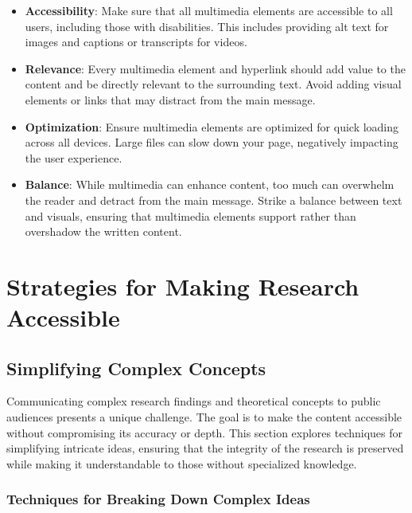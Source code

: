\documentclass[
]{book}
\begin{document}
\begin{itemize}
\item
  \textbf{Accessibility}: Make sure that all multimedia elements are accessible to all users, including those with disabilities. This includes providing alt text for images and captions or transcripts for videos.
\item
  \textbf{Relevance}: Every multimedia element and hyperlink should add value to the content and be directly relevant to the surrounding text. Avoid adding visual elements or links that may distract from the main message.
\item
  \textbf{Optimization}: Ensure multimedia elements are optimized for quick loading across all devices. Large files can slow down your page, negatively impacting the user experience.
\item
  \textbf{Balance}: While multimedia can enhance content, too much can overwhelm the reader and detract from the main message. Strike a balance between text and visuals, ensuring that multimedia elements support rather than overshadow the written content.
\end{itemize}

\hypertarget{strategies-for-making-research-accessible}{%
\section*{Strategies for Making Research Accessible}\label{strategies-for-making-research-accessible}}

\hypertarget{simplifying-complex-concepts}{%
\subsection*{Simplifying Complex Concepts}\label{simplifying-complex-concepts}}

Communicating complex research findings and theoretical concepts to public audiences presents a unique challenge. The goal is to make the content accessible without compromising its accuracy or depth. This section explores techniques for simplifying intricate ideas, ensuring that the integrity of the research is preserved while making it understandable to those without specialized knowledge.

\hypertarget{techniques-for-breaking-down-complex-ideas}{%
\subsubsection{Techniques for Breaking Down Complex Ideas}\label{techniques-for-breaking-down-complex-ideas}}
\end{document}
